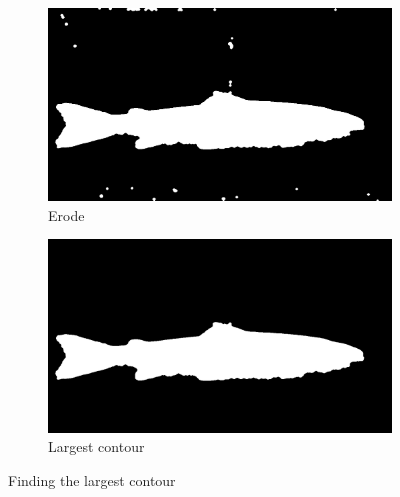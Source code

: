 \begin{figure}[H]
    \medskip
    \begin{subfigure}{0.48\textwidth}
        \includegraphics[width=\linewidth]{images/implementation/4_5_erode}
        \caption{Erode} 
        \label{fig:erode_contour}
    \end{subfigure}\hspace*{\fill}
    \begin{subfigure}{0.48\textwidth}
        \includegraphics[width=\linewidth]{images/implementation/4_largest_contour}
        \caption{Largest contour} 
        \label{fig:largest_contour_2}
    \end{subfigure}
    \caption{Finding the largest contour} 
    \label{fig:find_largest_contour}
\end{figure}


